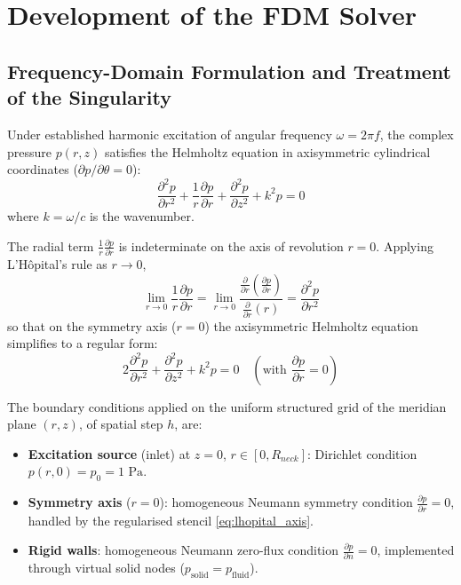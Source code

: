 \documentclass[11pt,a4paper,twocolumn]{article}
\begin{document}
\section{Development of the FDM Solver}
\subsection{Frequency-Domain Formulation and Treatment of the Singularity}
Under established harmonic excitation of angular frequency $\omega = 2\pi f$, the complex pressure $p(r,z)$ satisfies the Helmholtz equation in axisymmetric cylindrical coordinates ($\partial p/\partial \theta = 0$):
\begin{equation}
\label{eq:helmholtz_radial}
\frac{\partial^2 p}{\partial r^2} + \frac{1}{r}\frac{\partial p}{\partial r} + \frac{\partial^2 p}{\partial z^2} + k^2 p = 0
\end{equation}
where $k = \omega/c$ is the wavenumber.

The radial term $\frac{1}{r}\frac{\partial p}{\partial r}$ is indeterminate on the axis of revolution $r=0$. Applying L'H\^opital's rule as $r \to 0$,
\begin{equation}
\lim_{r \to 0} \frac{1}{r}\frac{\partial p}{\partial r} = \lim_{r \to 0} \frac{\frac{\partial}{\partial r}\left(\frac{\partial p}{\partial r}\right)}{\frac{\partial}{\partial r}(r)} = \frac{\partial^2 p}{\partial r^2}
\end{equation}
so that on the symmetry axis ($r=0$) the axisymmetric Helmholtz equation simplifies to a regular form:
\begin{equation}
\label{eq:lhopital_axis}
2\frac{\partial^2 p}{\partial r^2} + \frac{\partial^2 p}{\partial z^2} + k^2 p = 0 \quad (\text{with } \frac{\partial p}{\partial r} = 0)
\end{equation}

The boundary conditions applied on the uniform structured grid of the meridian plane $(r,z)$, of spatial step $h$, are:
\begin{itemize}
    \item \textbf{Excitation source} (inlet) at $z=0$, $r \in [0, R_{neck}]$: Dirichlet condition $p(r,0) = p_0 = 1\text{ Pa}$.
    \item \textbf{Symmetry axis} ($r=0$): homogeneous Neumann symmetry condition $\frac{\partial p}{\partial r} = 0$, handled by the regularised stencil \eqref{eq:lhopital_axis}.
    \item \textbf{Rigid walls}: homogeneous Neumann zero-flux condition $\frac{\partial p}{\partial n} = 0$, implemented through virtual solid nodes ($p_{\mathrm{solid}} = p_{\mathrm{fluid}}$).
\end{itemize}
\end{document}
